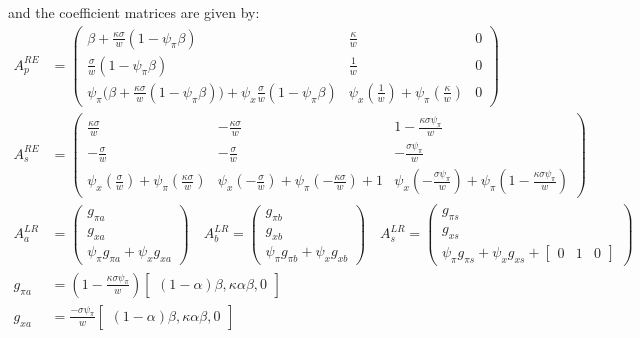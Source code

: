 \documentclass[11pt]{article}
\renewcommand{\[}{\begin{equation}}
\renewcommand{\]}{\end{equation}}
\begin{document}
and the coefficient matrices are given by:
\begin{align}
A_p^{RE} & = \begin{pmatrix} \beta + \frac{\kappa\sigma}{w} (1-\psi_{\pi}\beta) & \frac{\kappa}{w} & 0\\
 \frac{\sigma}{w} (1-\psi_{\pi}\beta) & \frac{1}{w}& 0\\ 
\psi_{\pi}\big( \beta + \frac{\kappa\sigma}{w} (1-\psi_{\pi}\beta) \big) +\psi_x\frac{\sigma}{w} (1-\psi_{\pi}\beta)&  \psi_x (\frac{1}{w})+ \psi_{\pi} (\frac{\kappa}{w})& 0\end{pmatrix} \quad \\
A_s^{RE} &= \begin{pmatrix}   \frac{\kappa\sigma}{w}  &-\frac{\kappa\sigma}{w}  & 1-\frac{\kappa\sigma\psi_{\pi}}{w}\\
 - \frac{ \sigma}{w} &  -\frac{\sigma}{w} & -\frac{\sigma\psi_{\pi}}{w}\\ 
 \psi_x( \frac{\sigma}{w}) + \psi_{\pi}( \frac{\kappa\sigma}{w}) & \psi_x(- \frac{\sigma}{w}) + \psi_{\pi}(- \frac{\kappa\sigma}{w}) +1 &  \psi_x(-\frac{\sigma\psi_{\pi}}{w}) + \psi_{\pi}( 1-\frac{\kappa\sigma\psi_{\pi}}{w})\end{pmatrix}  
\\
A_a^{LR} & = \begin{pmatrix} g_{\pi a} \\ g_{x a} \\ \psi_{\pi}g_{\pi a} + \psi_xg_{x a}
\end{pmatrix}
\quad A_b^{LR} = \begin{pmatrix} g_{\pi b} \\ g_{x b} \\ \psi_{\pi}g_{\pi b} + \psi_xg_{x b}
\end{pmatrix}
 \quad A_s^{LR} = \begin{pmatrix} g_{\pi s} \\ g_{x s} \\ \psi_{\pi}g_{\pi s} + \psi_xg_{x s} + \begin{bmatrix} 0 & 1& 0\end{bmatrix}
\end{pmatrix} \\
g_{\pi a} & =(1-\frac{\kappa\sigma\psi_{\pi}}{w} )  \begin{bmatrix}(1-\alpha)\beta, \kappa\alpha\beta, 0 \end{bmatrix} \\
g_{x a} & =  \frac{-\sigma\psi_{\pi}}{w} \begin{bmatrix}(1-\alpha)\beta, \kappa\alpha\beta, 0 \end{bmatrix}\\

\end{align}
\end{document}
